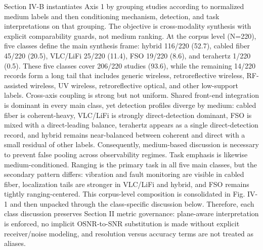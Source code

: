 {}\markdownRendererThematicBreak{}\markdownRendererInterblockSeparator
{}
\markdownRendererSectionEnd 
\markdownRendererSectionEnd \markdownRendererSectionBegin
{}\markdownRendererInterblockSeparator
{}Section IV-B instantiates Axis 1 by grouping studies according to normalized medium labels and then conditioning mechanism, detection, and task interpretations on that grouping. The objective is cross-modality synthesis with explicit comparability guards, not medium ranking. At the corpus level (N=220), five classes define the main synthesis frame: hybrid 116/220 (52.7\markdownRendererPercentSign{}), cabled fiber 45/220 (20.5\markdownRendererPercentSign{}), VLC/LiFi 25/220 (11.4\markdownRendererPercentSign{}), FSO 19/220 (8.6\markdownRendererPercentSign{}), and terahertz 1/220 (0.5\markdownRendererPercentSign{}). These five classes cover 206/220 studies (93.6\markdownRendererPercentSign{}), while the remaining 14/220 records form a long tail that includes generic wireless, retroreflective wireless, RF-assisted wireless, UV wireless, retroreflective optical, and other low-support labels.\markdownRendererParagraphSeparator
{}Cross-axis coupling is strong but not uniform. Shared front-end integration is dominant in every main class, yet detection profiles diverge by medium: cabled fiber is coherent-heavy, VLC/LiFi is strongly direct-detection dominant, FSO is mixed with a direct-leading balance, terahertz appears as a single direct-detection record, and hybrid remains near-balanced between coherent and direct with a small residual of other labels. Consequently, medium-based discussion is necessary to prevent false pooling across observability regimes.\markdownRendererParagraphSeparator
{}Task emphasis is likewise medium-conditioned. Ranging is the primary task in all five main classes, but the secondary pattern differs: vibration and fault monitoring are visible in cabled fiber, localization tails are stronger in VLC/LiFi and hybrid, and FSO remains tightly ranging-centered. This corpus-level composition is consolidated in Fig. IV-1 and then unpacked through the class-specific discussion below. Therefore, each class discussion preserves Section II metric governance: plane-aware interpretation is enforced, no implicit OSNR-to-SNR substitution is made without explicit receiver/noise modeling, and resolution versus accuracy terms are not treated as aliases.\markdownRendererParagraphSeparator
{}\markdownRendererInterblockSeparator
